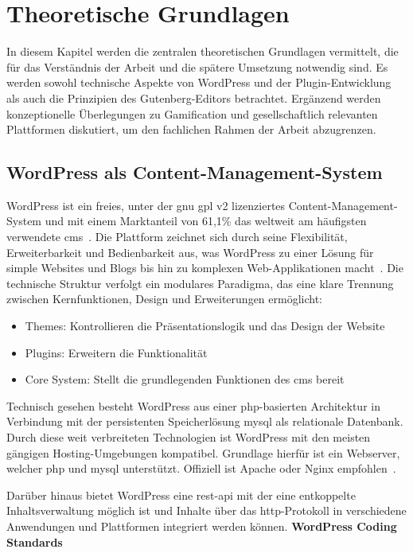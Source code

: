\chapter{Theoretische Grundlagen}
In diesem Kapitel werden die zentralen theoretischen Grundlagen vermittelt, die für das Verständnis der Arbeit und die spätere Umsetzung notwendig sind.
Es werden sowohl technische Aspekte von WordPress und der Plugin-Entwicklung als auch die Prinzipien des Gutenberg-Editors betrachtet.
Ergänzend werden konzeptionelle Überlegungen zu Gamification und gesellschaftlich relevanten Plattformen diskutiert, um den fachlichen Rahmen der Arbeit abzugrenzen.

\section{WordPress als Content-Management-System}
WordPress ist ein freies, unter der \gls{gnu} \gls{gpl} v2 lizenziertes Content-Management-System und mit einem Marktanteil von 61,1\% das weltweit am häufigsten verwendete \gls{cms}~\cite{statista2025cms}.
Die Plattform zeichnet sich durch seine Flexibilität, Erweiterbarkeit und Bedienbarkeit aus, was WordPress zu einer Lösung für simple Websites und Blogs bis hin zu komplexen Web-Applikationen macht~\cite{patel2019review}.
Die technische Struktur verfolgt ein modulares Paradigma, das eine klare Trennung zwischen Kernfunktionen, Design und Erweiterungen ermöglicht:
\begin{itemize}

 \item Themes: Kontrollieren die Präsentationslogik und das Design der Website

 \item Plugins: Erweitern die Funktionalität

 \item Core System: Stellt die grundlegenden Funktionen des \gls{cms} bereit

\end{itemize}
Technisch gesehen besteht WordPress aus einer \gls{php}-basierten Architektur in Verbindung mit der persistenten Speicherlösung \gls{mysql} als relationale Datenbank.
Durch diese weit verbreiteten Technologien ist WordPress mit den meisten gängigen Hosting-Umgebungen kompatibel.
Grundlage hierfür ist ein Webserver, welcher \gls{php} und \gls{mysql} unterstützt.
Offiziell ist Apache oder Nginx empfohlen~\cite{wordpress2024requirements}.

Darüber hinaus bietet WordPress eine \gls{rest}-\gls{api} mit der eine entkoppelte Inhaltsverwaltung möglich ist und Inhalte über das \gls{http}-Protokoll in verschiedene Anwendungen und Plattformen integriert werden können.
\textbf{WordPress Coding Standards}

